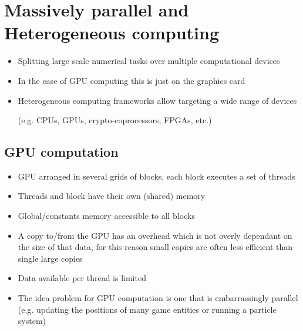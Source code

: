 \documentclass[a4paper]{article}
\begin{document}
\section{Massively parallel and Heterogeneous computing}

\begin{itemize}
  \item
    Splitting large scale numerical tasks over multiple computational devices

  \item
    In the case of GPU computing this is just on the graphics card

  \item
    Heterogeneous computing frameworks allow targeting a wide range of devices

    (e.g. CPUs, GPUs, crypto-coprocessors, FPGAs, etc.)

\end{itemize}

\subsection{GPU computation}

\begin{itemize}
  \item
    GPU arranged in several grids of blocks, each block executes a set of
    threads

  \item
    Threads and block have their own (shared) memory

  \item
    Global/constants memory accessible to all blocks

  \item
    A copy to/from the GPU has an overhead which is not overly dependant on the
    size of that data, for this reason small copies are often less efficient
    than single large copies

  \item
    Data available per thread is limited

  \item
    The idea problem for GPU computation is one that is embarrassingly parallel
    (e.g. updating the positions of many game entities or running a particle
    system)

\end{itemize}
\end{document}
